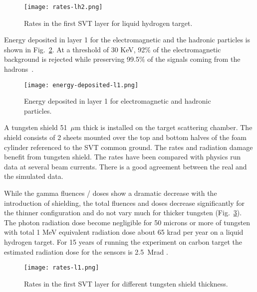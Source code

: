 \begin{figure}[hbt] 
\centering 
\texttt{[image: rates-lh2.png]}
\caption{Rates in the first SVT layer for liquid hydrogen target.}
\label{fig:rates-lh2}
\end{figure}

Energy deposited in layer 1 for the electromagnetic and the hadronic particles is shown in Fig.~\ref{fig:energy-deposited-l1}. At a threshold of 30 KeV, 92$\%$ of the electromagnetic background is rejected while preserving  99.5$\%$ of the signals coming from the hadrons~\cite{TDRSVT}.

\begin{figure}[hbt] 
\centering 
\texttt{[image: energy-deposited-l1.png]}
\caption{Energy deposited in layer 1 for electromagnetic and hadronic particles.}
\label{fig:energy-deposited-l1}
\end{figure}

A tungsten shield 51~$\mu$m thick is installed on the target scattering chamber. The shield consists of 2 sheets mounted over the top and bottom halves of the foam cylinder referenced to the SVT common ground. The rates and radiation damage benefit from tungsten shield. The rates have been compared with physics run data at several beam currents. There is a good agreement between the real and the simulated data.

While the gamma fluences / doses show a dramatic decrease with the introduction of shielding, the total fluences and doses decrease significantly for the thinner configuration and do not vary much for thicker tungsten (Fig.~\ref{fig:rates-l1}). The photon radiation dose become negligible for 50 microns or more of tungsten with total 1 MeV equivalent radiation dose about 65 krad per year on a liquid hydrogen target. For 15 years of running the experiment on carbon target the estimated radiation dose for the sensors is 2.5~Mrad \cite{TDRSVT}. 

\begin{figure}[hbt] 
\centering 
\texttt{[image: rates-l1.png]}
\caption{Rates in the first SVT layer for different tungsten shield thickness.}
\label{fig:rates-l1}
\end{figure}


